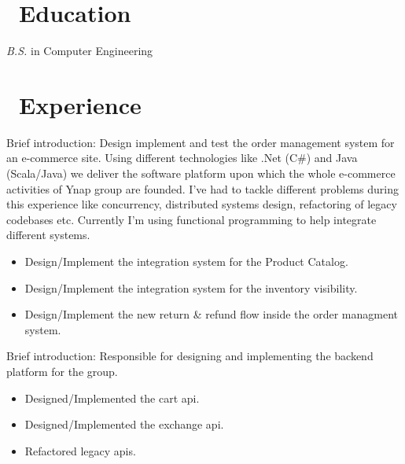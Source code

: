 \documentclass{resume}
\begin{document}



\section{\faGraduationCap\ Education}
\textit{B.S.} in Computer Engineering

\section{\faUsers\ Experience}
Brief introduction: Design implement and test the order management system for an e-commerce site.
Using different technologies like .Net (C\#) and Java (Scala/Java) we deliver the software platform upon which the whole e-commerce activities of Ynap group are founded.
I’ve had to tackle different problems during this experience like concurrency, distributed systems design, refactoring of legacy codebases etc.
Currently I’m using functional programming to help integrate different systems.
\begin{itemize}
  \item Design/Implement the integration system for the Product Catalog.
  \item Design/Implement the integration system for the inventory visibility.
  \item Design/Implement the new return \& refund flow inside the order managment system.
\end{itemize}

Brief introduction: Responsible for designing and implementing the backend platform for the group.
\begin{itemize}
  \item Designed/Implemented the cart api.
  \item Designed/Implemented the exchange api.
  \item Refactored legacy apis.
\end{itemize}
\end{document}
